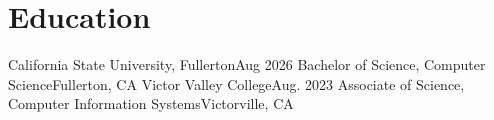 \section{Education}
  \resumeSubHeadingListStart
  
    \resumeSubHeading
      {California State University, Fullerton}{Aug 2026}
      {Bachelor of Science, Computer Science}{Fullerton, CA}
      \resumeItemListStart
      \resumeItemListEnd
    \resumeSubHeading
      {Victor Valley College}{Aug. 2023}
      {Associate of Science, Computer Information Systems}{Victorville, CA}
  
  \resumeSubHeadingListEnd
